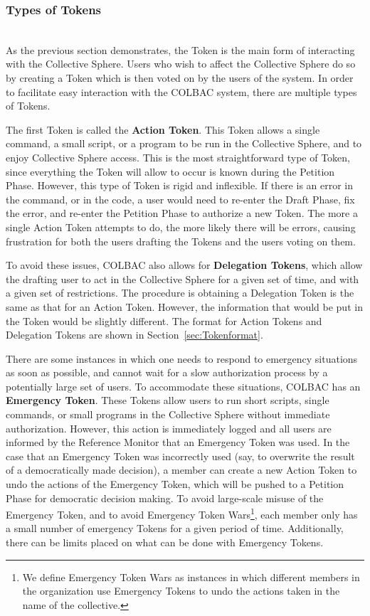 \subsubsection{Types of Tokens}
\label{sec:Tokentypes}
\mbox{}\\
As the previous section demonstrates, the Token is the main form of interacting
with the Collective Sphere. Users who wish to affect the Collective Sphere do
so by creating a Token which is then voted on by the users of the system. In
order to facilitate easy interaction with the COLBAC system, there are multiple
types of Tokens.

The first Token is called the \textbf{Action Token}. This Token allows a single
command, a small script, or a program to be run in the Collective Sphere, and to
enjoy Collective Sphere access. This is the most straightforward type of Token,
since everything the Token will allow to occur is known during the Petition
Phase. However, this type of Token is rigid and inflexible. If there is an error
in the command, or in the code, a user would need to re-enter the Draft Phase,
fix the error, and re-enter the Petition Phase to authorize a new Token. The
more a single Action Token attempts to do, the more likely there will be errors,
causing frustration for both the users drafting the Tokens and the users voting
on them.

To avoid these issues, COLBAC also allows for \textbf{Delegation Tokens}, which
allow the drafting user to act in the Collective Sphere for a given set of time,
and with a given set of restrictions. The procedure is obtaining a Delegation
Token is the same as that for an Action Token. However, the information that
would be put in the Token would be slightly different. The format for Action
Tokens and Delegation Tokens are shown in Section~\ref{sec:Tokenformat}.

There are some instances in which one needs to respond to emergency situations
as soon as possible, and cannot wait for a slow authorization process by a
potentially large set of users. To accommodate these situations, COLBAC has an
\textbf{Emergency Token}. These Tokens allow users to run short scripts, single
commands, or small programs in the Collective Sphere without immediate
authorization. However, this action is immediately logged and all users are
informed by the Reference Monitor that an Emergency Token was used. In the case
that an Emergency Token was incorrectly used (say, to overwrite the result of
a democratically made decision), a member can create a new Action Token to
undo the actions of the Emergency Token, which will be pushed to a Petition
Phase for democratic decision making. To avoid large-scale misuse of the
Emergency Token, and to avoid Emergency Token Wars\footnote{We define Emergency
Token Wars as instances in which different members in the organization use
Emergency Tokens to undo the actions taken in the name of the collective.},
each member only has a small number of emergency Tokens for a given period of
time. Additionally, there can be limits placed on what can be done with 
Emergency Tokens.

